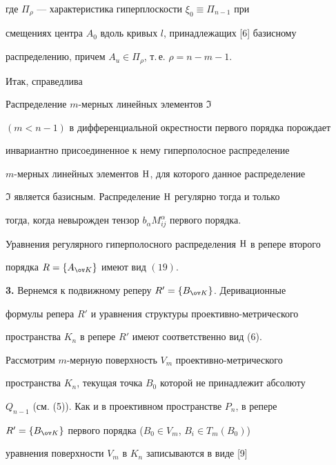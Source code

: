 где $\Pi_\rho$ --- характеристика гиперплоскости $\xi_0\equiv\Pi_{n-1}$ при 


смещениях центра $A_0$ вдоль кривых $l$, принадлежащих [6] базисному 


распределению, причем $A_u\in\Pi_\rho$, т.\,е. $\rho=n-m-1$. 


 


Итак, справедлива 


 


\begin{thm} 


Распределение $m$-мерных линейных элементов $\Im$ 


$(m<n-1)$ в дифференциальной окрестности первого порядка порождает 


инвариантно присоединенное к нему гиперполосное распределение 


$m$-мерных линейных элементов $\mathrm H$, для которого данное распределение 


$\Im$ является базисным. Распределение $\mathrm H$ регулярно тогда и только 


тогда, когда невырожден тензор $b_\alpha M^\alpha_{ij}$ первого порядка. 


Уравнения регулярного гиперполосного распределения $\mathrm H$ в репере второго 


порядка $R=\{A_{\ov K}\}$ имеют вид $(19)$. 


\end{thm} 


 


 


{\bf 3.} Вернемся к подвижному реперу $R'=\{B_{\ov K}\}$. Деривационные 


формулы репера $R'$ и уравнения структуры проективно-метрического 


пространства $K_n$ в репере $R'$ имеют соответственно вид (6). 


 


Рассмотрим $m$-мерную поверхность $V_m$ проективно-метрического 


пространства $K_n$, текущая точка $B_0$ которой не принадлежит абсолюту 


$Q_{n-1}$ (см. (5)). Как и в проективном пространстве $P_n$, в репере 


$R'=\{B_{\ov K}\}$ первого порядка ($B_0\in V_m$, $B_i\in T_m(B_0)$) 


уравнения поверхности $V_m$ в $K_n$ записываются в виде [9] 


